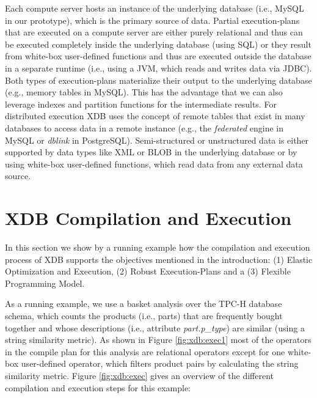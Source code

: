 \documentclass{sig-alternate}
\begin{document}
Each compute server hosts an instance of the underlying database (i.e., MySQL in our prototype), which is the primary source of data. Partial execution-plans that are executed on a compute server are either purely relational and thus can be executed completely inside the underlying database (using SQL) or they result from white-box user-defined functions and thus are  executed outside the database in a separate runtime (i.e., using a JVM, which reads and writes data via JDBC). Both types of execution-plans materialize their output to the underlying database (e.g., memory tables in MySQL). This has the advantage that we can also leverage indexes and partition functions for the intermediate results. For distributed execution XDB uses the concept of remote tables that exist in many databases to access data in a remote instance (e.g., the \emph{federated} engine in MySQL or \emph{dblink} in PostgreSQL). Semi-structured or unstructured data is either supported by data types like XML or BLOB in the underlying database or by using white-box user-defined functions, which read data from any external data source.

\section{XDB Compilation and Execution}
\label{sec:exec}

\begin{figure*}[ht]
\hspace{-6ex}
\hspace{-3ex}
\hspace{-2.5ex}
\vspace{-3ex}
\caption{XDB Compilation and Execution Steps}
\label{fig:xdb:exec}
\vspace{-2ex}
\end{figure*}

In this section we show by a running example how the compilation and execution process of XDB supports the objectives mentioned in the introduction: (1) Elastic Optimization and Execution, (2) Robust Execution-Plans and a (3) Flexible Programming Model.

As a running example, we use a basket analysis over the TPC-H database schema, which counts the products (i.e., parts) that are frequently bought together and whose descriptions (i.e., attribute \emph{part.p\_type}) are similar (using a string similarity metric).  As shown in Figure \ref{fig:xdb:exec1} most of the operators in the compile plan for this analysis are relational operators except for one white-box user-defined operator, which filters product pairs by calculating the string similarity metric. 
Figure \ref{fig:xdb:exec} gives an overview of the different compilation and execution steps for this example:
\end{document}
